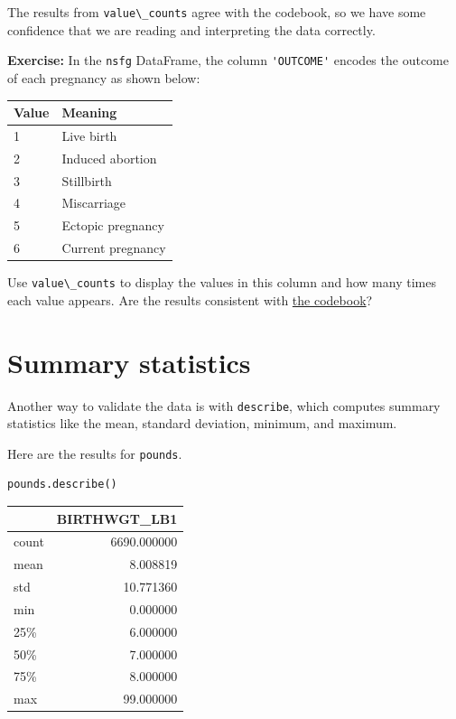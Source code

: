 The results from \passthrough{\lstinline!value\_counts!} agree with the
codebook, so we have some confidence that we are reading and
interpreting the data correctly.

\textbf{Exercise:} In the \passthrough{\lstinline!nsfg!} DataFrame, the
column \passthrough{\lstinline!'OUTCOME'!} encodes the outcome of each
pregnancy as shown below:

\begin{longtable}[]{@{}ll@{}}
\toprule
Value & Meaning\tabularnewline
\midrule
\endhead
1 & Live birth\tabularnewline
2 & Induced abortion\tabularnewline
3 & Stillbirth\tabularnewline
4 & Miscarriage\tabularnewline
5 & Ectopic pregnancy\tabularnewline
6 & Current pregnancy\tabularnewline
\bottomrule
\end{longtable}

Use \passthrough{\lstinline!value\_counts!} to display the values in
this column and how many times each value appears. Are the results
consistent with
\href{https://github.com/AllenDowney/ElementsOfDataScience/raw/master/data/2015-2017_NSFG_FemPregFile_Codebook-508.pdf}{the
codebook}?

\hypertarget{summary-statistics}{%
\section{Summary statistics}\label{summary-statistics}}

Another way to validate the data is with
\passthrough{\lstinline!describe!}, which computes summary statistics
like the mean, standard deviation, minimum, and maximum.

Here are the results for \passthrough{\lstinline!pounds!}.

\begin{lstlisting}[language=Python,style=source]
pounds.describe()
\end{lstlisting}

\begin{tabular}{lr}
\toprule
{} &  BIRTHWGT\_LB1 \\
\midrule
count &   6690.000000 \\
mean  &      8.008819 \\
std   &     10.771360 \\
min   &      0.000000 \\
25\%   &      6.000000 \\
50\%   &      7.000000 \\
75\%   &      8.000000 \\
max   &     99.000000 \\
\bottomrule
\end{tabular}

